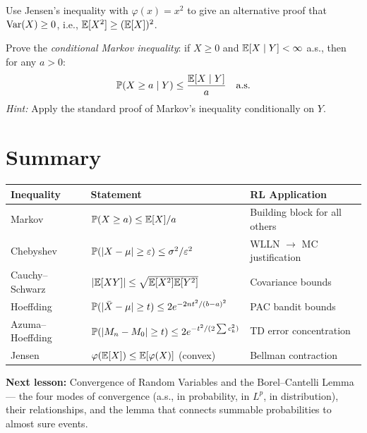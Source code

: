 \documentclass[11pt,a4paper]{article}
\begin{document}
\begin{exercise}
\label{ex:jensen_variance}
Use Jensen's inequality with $\varphi(x) = x^2$ to give an
alternative proof that $\operatorname{Var}(X) \geq 0$, i.e.,
$\mathbb{E}[X^2] \geq (\mathbb{E}[X])^2$.
\end{exercise}

\begin{exercise}
\label{ex:conditional_markov}
Prove the \emph{conditional Markov inequality}: if $X \geq 0$
and $\mathbb{E}[X \mid Y] < \infty$ a.s., then for any $a > 0$:
\[
  \mathbb{P}(X \geq a \mid Y) \leq \frac{\mathbb{E}[X \mid Y]}{a}
  \quad \text{a.s.}
\]
\textit{Hint:} Apply the standard proof of Markov's inequality
conditionally on $Y$.
\end{exercise}


\section{Summary}
\label{sec:summary}

\begin{center}
\renewcommand{\arraystretch}{1.4}
\begin{tabular}{p{3.5cm} p{5cm} p{5.5cm}}
\toprule
\textbf{Inequality} & \textbf{Statement} &
  \textbf{RL Application} \\
\midrule
Markov &
  $\mathbb{P}(X \geq a) \leq \mathbb{E}[X]/a$ &
  Building block for all others \\
Chebyshev &
  $\mathbb{P}(|X - \mu| \geq \varepsilon)
    \leq \sigma^2/\varepsilon^2$ &
  WLLN $\to$ MC justification \\
Cauchy--Schwarz &
  $|\mathbb{E}[XY]| \leq \sqrt{\mathbb{E}[X^2]\mathbb{E}[Y^2]}$ &
  Covariance bounds \\
Hoeffding &
  $\mathbb{P}(|\bar{X} - \mu| \geq t)
    \leq 2e^{-2nt^2/(b-a)^2}$ &
  PAC bandit bounds \\
Azuma--Hoeffding &
  $\mathbb{P}(|M_n - M_0| \geq t)
    \leq 2e^{-t^2/(2\sum c_k^2)}$ &
  TD error concentration \\
Jensen &
  $\varphi(\mathbb{E}[X]) \leq \mathbb{E}[\varphi(X)]$ (convex) &
  Bellman contraction \\
\bottomrule
\end{tabular}
\end{center}

\medskip
\noindent\textbf{Next lesson:} Convergence of Random Variables
and the Borel--Cantelli Lemma --- the four modes of convergence
(a.s., in probability, in $L^p$, in distribution), their
relationships, and the lemma that connects summable probabilities
to almost sure events.


\end{document}
